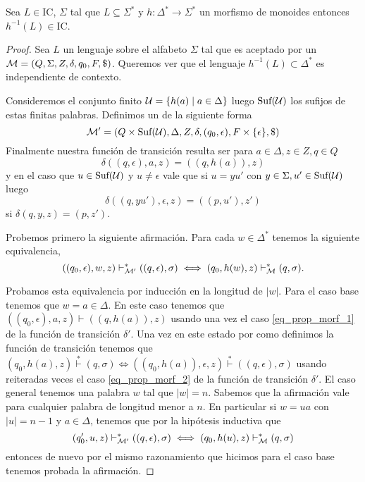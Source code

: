 \documentclass[tesis.tex]{subfiles}
\begin{document}
\begin{prop}
	\label{prop:IC_preimagenes_monoides}
	Sea $L \in \text{IC}$, $\Sigma$ tal que $L \subseteq \Sigma^{*}$ y $h:\Delta^{*} \to \Sigma^*$ un morfismo de monoides 
	entonces $h^{-1}(L) \in \text{IC}$.
\end{prop}

\begin{proof}
	Sea $L$ un lenguaje \ic sobre el alfabeto $\Sigma$ tal que es aceptado por un \APND ${\cal M } = (Q, \Sigma, Z, \delta, q_0, F, \$)$.
	Queremos ver que el lenguaje $h^{-1}(L) \subset \Delta^*$ es independiente de contexto.
	 
	 Consideremos el conjunto finito ${\cal U } = \{ h(a) \mid a \in \Delta \}$ luego $\text{Suf}(\cal U)$ los sufijos de estas finitas palabras.
	Definimos un \APND de la siguiente forma
	\[
	{\cal M' } = (Q \times \text{Suf}({\cal U}), \Delta, Z, \delta, (q_0, \epsilon), F \times \{ \epsilon \}, \$)
	\]
	Finalmente nuestra función de transición resulta ser para $a \in \Delta, z \in Z, q \in Q$
	\begin{equation}\label{eq_prop_morf_1}
		\delta((q,\epsilon),a,z) = ((q,h(a)),z)
	\end{equation} 
	y en el caso que $u \in \text{Suf}(\cal U)$ y $u \neq \epsilon$ vale que si $u = yu'$ con $y \in \Sigma, u' \in \text{Suf}(\cal U)$ luego
	\begin{equation}\label{eq_prop_morf_2}
		\delta((q,yu'),\epsilon,z) = ((p,u'),z')
	\end{equation}
	si $\delta(q,y,z) = (p,z')$.
	
	Probemos primero la siguiente afirmación.
	Para cada $w \in \Delta^*$ tenemos la siguiente equivalencia,
	\[
	((q_0, \epsilon),w,z) \vdash^*_{\cal M'} ((q,\epsilon), \sigma) \iff (q_0,h(w), z) \vdash^*_{\cal M} (q, \sigma).
	\]
	
	Probamos esta equivalencia por inducción en la longitud de $|w|$.
	Para el caso base tenemos que $w = a \in \Delta$.
	En este caso tenemos que $((q_0, \epsilon), a, z) \vdash ((q,h(a)), z)$ usando una vez el caso \ref{eq_prop_morf_1} de la función de transición $\delta'$.
	Una vez en este estado por como definimos la función de transición tenemos que $ (q_0,h(a), z) \overset{*}{\vdash }(q, \sigma)  \iff ((q_0,h(a)), \epsilon ,z) \overset{*}{\vdash} ((q,\epsilon), \sigma)$ usando reiteradas veces el caso \ref{eq_prop_morf_2} de la función de transición $\delta'$.
	El caso general tenemos una palabra $w$ tal que $|w|=n$.
	Sabemos que la afirmación vale para cualquier palabra de longitud menor a $n$.
	En particular si $w=ua$ con $|u|=n-1$ y $a \in \Delta$, tenemos que por la hipótesis inductiva que 
	\[
	(q_0',u,z) \vdash^*_{\cal M'} ((q,\epsilon), \sigma) \iff (q_0,h(u), z) \vdash^*_{\cal M} (q, \sigma)
	\]
	entonces de nuevo por el mismo razonamiento que hicimos para el caso base tenemos probada la afirmación.
	

\end{proof}
\end{document}
